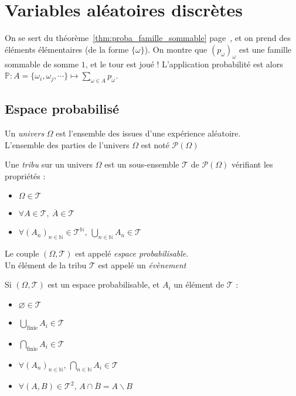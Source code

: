 \documentclass[11pt,a4paper,fleqn,pdftex]{report}
\begin{document}
\chapter{Variables aléatoires discrètes} %
\label{cha:variables_aleatoires_discretes}
\begin{methode}
     On se sert du théorème~\ref{thm:proba_famille_sommable} page~\pageref{thm:proba_famille_sommable}, et on prend des éléments élémentaires (de la forme $\lbrace \omega \rbrace$). On montre que $(p_\omega )_{\omega}$ est une famille sommable de somme $1$, et le tour est joué ! L'application probabilité est alors $\mathbb{P} : A= \lbrace \omega_i, \omega_j, \cdots  \rbrace \longmapsto \sum_{\omega\in A} p_\omega$.
\end{methode}
\section{Espace probabilisé} %
\label{sec:espace_probabilise}
\begin{dfn}[Univers]
     Un \emph{univers} $\Omega$ est l'ensemble des issues d'une expérience aléatoire.\\
     L'ensemble des parties de l'univers $\Omega$ est noté $\mathscr{P}(\Omega{})$
\end{dfn}
\begin{dfn}
     Une \emph{tribu} sur un univers $\Omega$ est un sous-ensemble $\mathscr{T}$ de $\mathscr{P}(\Omega{})$ vérifiant les propriétés :
     \begin{itemize}
         \item $\Omega \in \mathscr{T}$
         \item $\forall A \in \mathscr{T},\: \overline{A} \in \mathscr{T}$
         \item $\forall \left( A_n \right)_{n\in \mathbb{N}} \in \mathscr{T}^\mathbb{N},\: \bigcup_{n\in \mathbb{N}} A_n \in \mathscr{T}$
     \end{itemize}
     Le couple $(\Omega, \mathscr{T})$ est appelé \emph{espace probabilisable}.\\
     Un élément de la tribu $\mathscr{T}$ est appelé un \emph{évènement}
\end{dfn}
\begin{prop}
     Si $(\Omega, \mathscr{T})$ est un espace probabilisable, et $A_i$ un élément de $\mathscr{T}$ :
     \begin{itemize}
         \item $\varnothing \in \mathscr{T}$
         \item $\bigcup_\text{finie} A_i \in \mathscr{T}$
         \item $\bigcap_\text{finie} A_i \in \mathscr{T}$
         \item $\forall (A_n)_{n\in \mathbb{N}},\, \bigcap_{n\in \mathbb{N}} A_i \in \mathscr{T}$
         \item $\forall (A,B) \in \mathscr{T}^2,\, A\cap \overline{B} = A \backslash B$
     \end{itemize}
\end{prop}
\end{document}
